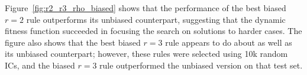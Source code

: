 Figure~\ref{fig:r2_r3_rho_biased} shows that the performance of the best biased $r = 2$ rule outperforms its unbiased counterpart, suggesting that 
the dynamic fitness function succeeded in focusing the search on solutions to harder cases. The figure also shows that the best biased $r = 3$ rule 
appears to do about as well as its unbiased counterpart; however, these rules were selected using 10k random ICs, and the biased $r = 3$ rule 
outperformed the unbiased version on that test set.


